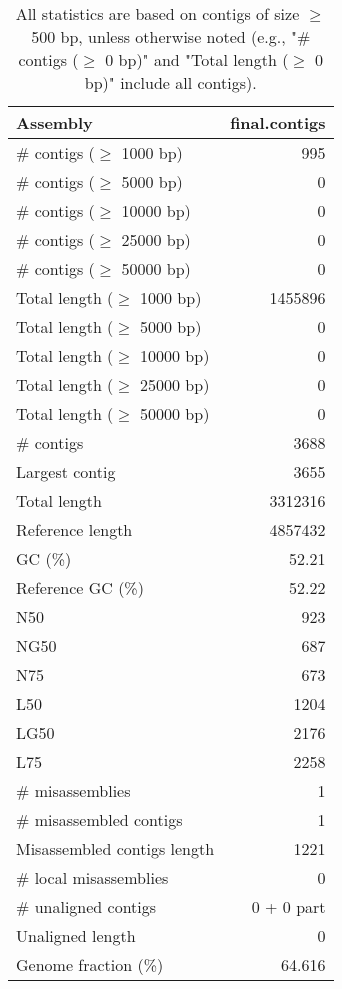 \documentclass[12pt,a4paper]{article}
\begin{document}
\begin{table}[ht]
\begin{center}
\caption{All statistics are based on contigs of size $\geq$ 500 bp, unless otherwise noted (e.g., "\# contigs ($\geq$ 0 bp)" and "Total length ($\geq$ 0 bp)" include all contigs).}
\begin{tabular}{|l*{1}{|r}|}
\hline
Assembly & final.contigs \\ \hline
\# contigs ($\geq$ 1000 bp) & 995 \\ \hline
\# contigs ($\geq$ 5000 bp) & 0 \\ \hline
\# contigs ($\geq$ 10000 bp) & 0 \\ \hline
\# contigs ($\geq$ 25000 bp) & 0 \\ \hline
\# contigs ($\geq$ 50000 bp) & 0 \\ \hline
Total length ($\geq$ 1000 bp) & 1455896 \\ \hline
Total length ($\geq$ 5000 bp) & 0 \\ \hline
Total length ($\geq$ 10000 bp) & 0 \\ \hline
Total length ($\geq$ 25000 bp) & 0 \\ \hline
Total length ($\geq$ 50000 bp) & 0 \\ \hline
\# contigs & 3688 \\ \hline
Largest contig & 3655 \\ \hline
Total length & 3312316 \\ \hline
Reference length & 4857432 \\ \hline
GC (\%) & 52.21 \\ \hline
Reference GC (\%) & 52.22 \\ \hline
N50 & 923 \\ \hline
NG50 & 687 \\ \hline
N75 & 673 \\ \hline
L50 & 1204 \\ \hline
LG50 & 2176 \\ \hline
L75 & 2258 \\ \hline
\# misassemblies & 1 \\ \hline
\# misassembled contigs & 1 \\ \hline
Misassembled contigs length & 1221 \\ \hline
\# local misassemblies & 0 \\ \hline
\# unaligned contigs & 0 + 0 part \\ \hline
Unaligned length & 0 \\ \hline
Genome fraction (\%) & 64.616 \\ \hline

\end{tabular}
\end{center}
\end{table}
\end{document}
